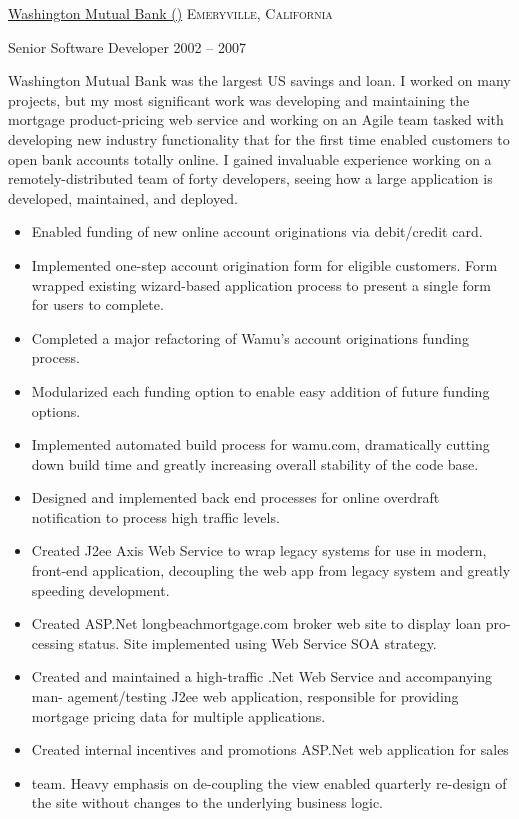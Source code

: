 \documentclass[10pt,a4paper]{article}
\begin{document}
\headedsection
  {\href{https://en.wikipedia.org/wiki/Washington_Mutual}{Washington Mutual Bank ()}}
  {\textsc{Emeryville, California}}
  {
  \headedsubsection
    {Senior Software Developer}
    {2002 -- 2007}
    {\bodytext
      {
        Washington Mutual Bank was the largest US savings and loan. I worked on many projects, but my most significant work was developing and maintaining the mortgage product-pricing web service and working on an Agile team tasked with developing new industry functionality that for the first time enabled customers to open bank accounts totally online. I gained invaluable experience working on a remotely-distributed team of forty developers, seeing how a large application is developed, maintained, and deployed.
        \begin{itemize}
          \item Enabled funding of new online account originations via debit/credit card.
          \item Implemented one-step account origination form for eligible customers. Form wrapped existing wizard-based application process to present a single form for users to complete.
          \item Completed a major refactoring of Wamu’s account originations funding process.
          \item Modularized each funding option to enable easy addition of future funding options.
          \item Implemented automated build process for wamu.com, dramatically cutting down build time and greatly increasing overall stability of the code base.
          \item Designed and implemented back end processes for online overdraft notification to process high traffic levels.
          \item Created J2ee Axis Web Service to wrap legacy systems for use in modern, front-end application, decoupling the web app from legacy system and greatly speeding development.
          \item Created ASP.Net longbeachmortgage.com broker web site to display loan pro-cessing status. Site implemented using Web Service SOA strategy.
          \item Created and maintained a high-traffic .Net Web Service and accompanying man- agement/testing J2ee web application, responsible for providing mortgage pricing data for multiple applications.
          \item Created internal incentives and promotions ASP.Net web application for sales
          \item team. Heavy emphasis on de-coupling the view enabled quarterly re-design of the site without changes to the underlying business logic.
        \end{itemize}
      }

}}
\end{document}
